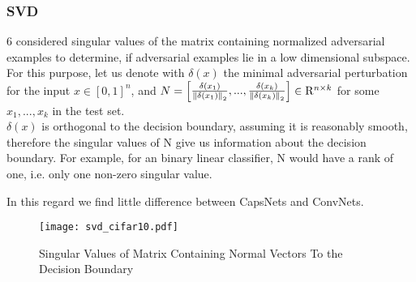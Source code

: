 \subsubsection{SVD}
6
\citet{universal} considered singular values of the matrix containing normalized adversarial examples to determine, if adversarial examples lie in a low dimensional subspace. \\
For this purpose, let us denote with $\delta(x)$ the minimal adversarial perturbation for the input $x \in [0,1]^n$,
and $ N = \begin{bmatrix}
\frac{\delta(x_1)} {\left \lVert \delta(x_1) \right \rVert _2},  ...,  \frac{\delta(x_k)} {\left \lVert \delta(x_k) \right \rVert _2} 
\end{bmatrix}
\in \mathrm{R}^{n \times k}
$ for some $x_1, ..., x_k$ in the test set. \\
$\delta(x)$ is orthogonal to the decision boundary, assuming it is reasonably smooth, therefore the singular values of N give us information about the decision boundary. For example, for an binary linear classifier, N would have a rank of one, i.e. only one non-zero singular value.

In this regard we find little difference between CapsNets and ConvNets.

\begin{figure}
	\caption{Singular Values of Matrix Containing Normal Vectors To the Decision Boundary}
	\texttt{[image: svd\_cifar10.pdf]}
	\label{fig:svd}
\end{figure}
